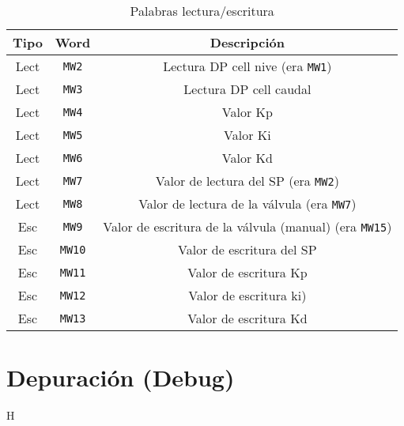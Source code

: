 \begin{table}[!t]

\renewcommand{\arraystretch}{1.3}
\centering
\begin{tabular}{c||c||c}
\hline
\bfseries Tipo & \bfseries Word  & \bfseries Descripción\\
\hline \hline
Lect & \verb|MW2|  & Lectura DP cell nive (era \verb|MW1|)\\
Lect & \verb|MW3|  & Lectura DP cell caudal\\
Lect & \verb|MW4|  & Valor Kp\\
Lect & \verb|MW5|  & Valor Ki\\
Lect & \verb|MW6|  & Valor Kd\\
Lect & \verb|MW7|  & Valor de lectura del SP (era \verb|MW2|)\\
Lect & \verb|MW8|  & Valor de lectura de la válvula (era \verb|MW7|)\\
\hline
Esc & \verb|MW9| & Valor de escritura de la válvula (manual) (era 
\verb|MW15|) \\
Esc & \verb|MW10|  & Valor de escritura del SP \\
Esc & \verb|MW11|  & Valor de escritura Kp \\
Esc & \verb|MW12|  & Valor de escritura ki) \\
Esc & \verb|MW13| & Valor de escritura Kd \\
\hline
\end{tabular}
\caption{Palabras lectura/escritura}
\label{table:palabraslecturasescrituras}
\end{table}

\section{Depuración (Debug)}
\label{sec:Debug}

H
